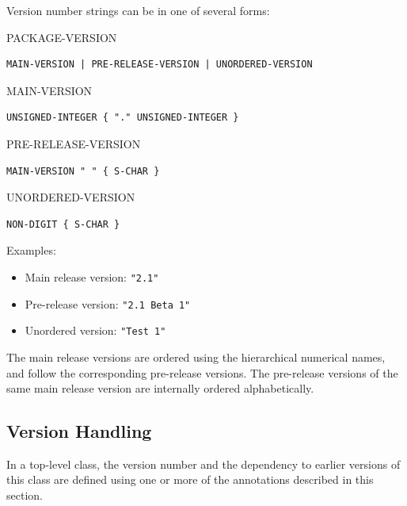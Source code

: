 Version number strings can be in one of several forms:

\begin{lexicalunit}{PACKAGE-VERSION}
\begin{lstlisting}
MAIN-VERSION | PRE-RELEASE-VERSION | UNORDERED-VERSION
\end{lstlisting}
\end{lexicalunit}

\begin{lexicalunit}{MAIN-VERSION}
\begin{lstlisting}
UNSIGNED-INTEGER { "." UNSIGNED-INTEGER }
\end{lstlisting}
\end{lexicalunit}

\begin{lexicalunit}{PRE-RELEASE-VERSION}
\begin{lstlisting}
MAIN-VERSION " " { S-CHAR }
\end{lstlisting}
\end{lexicalunit}

\begin{lexicalunit}{UNORDERED-VERSION}
\begin{lstlisting}
NON-DIGIT { S-CHAR }
\end{lstlisting}
\end{lexicalunit}

Examples:
\begin{itemize}
\item
  Main release version: \lstinline!"2.1"!
\item
  Pre-release version: \lstinline!"2.1 Beta 1"!
\item
  Unordered version: \lstinline!"Test 1"!
\end{itemize}

The main release versions are ordered using the hierarchical numerical names, and follow the corresponding pre-release versions.
The pre-release versions of the same main release version are internally ordered alphabetically.


\subsection{Version Handling}\label{version-handling}

In a top-level class, the version number and the dependency to earlier versions of this class are defined using one or more of the annotations described in this section.

